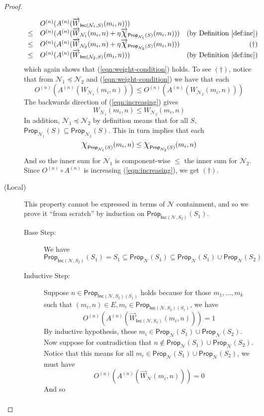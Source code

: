 \documentclass[letterpaper]{article}
\theoremstyle{definition}
\newcommand*{\bigchi}{\mbox{\Large$\chi$}}%
\newcommand{\Prop}{\textsf{Prop}}
\newcommand{\Inc}{\textsf{Inc}}
\newcommand{\Net}{\mathcal{N}}
\begin{document}
\begin{proof}
\begin{description}
\[\begin{array}{llr}
    &
    O^{(n)}(A^{(n)}(\overrightarrow{W}_{\Inc(\Net_1, S)}(m_i, n))) & 
    \\
    
    \leq &
    O^{(n)}(A^{(n)}(\overrightarrow{W}_{\Net_1}(m_i, n) + \eta \overrightarrow{\bigchi}_{\Prop_{\Net_1}(S)}(m_i, n))) & 
    \mbox{(by Definition~\ref{def:inc})}\\
    
    \leq &
    O^{(n)}(A^{(n)}(\overrightarrow{W}_{\Net_2}(m_i, n) + \eta \overrightarrow{\bigchi}_{\Prop_{\Net_2}(S)}(m_i, n))) & 
    (\dagger)\\
    
    \leq &
    O^{(n)}(A^{(n)}(\overrightarrow{W}_{\Inc(\Net_2, S)}(m_i, n))) & 
    \mbox{(by Definition~\ref{def:inc})}
    \end{array}
    \]
    which again shows that (\ref{eqn:weight-condition}) holds.  To see $(\dagger)$, notice that from $\Net_1 \preceq \Net_2$ and (\ref{eqn:weight-condition}) we have that each
    \[
    O^{(n)}(A^{(n)}(W_{\Net_1}(m_i, n))) \leq O^{(n)}(A^{(n)}(W_{\Net_2}(m_i, n)))
    \]
    The backwards direction of (\ref{eqn:increasing}) gives
    \[
    W_{\Net_1}(m_i, n) \leq W_{\Net_2}(m_i, n)
    \]
    In addition, $\Net_1 \preceq \Net_2$ by definition means that for all $S$, $\Prop_{\Net_1}(S) \subseteq \Prop_{\Net_2}(S)$.  This in turn implies that each
    \[
    \bigchi_{\Prop_{\Net_1}(S)}(m_i, n) \leq \bigchi_{\Prop_{\Net_2}(S)}(m_i, n)
    \]
    And so the inner sum for $\Net_1$ is component-wise $\leq$ the inner sum for $\Net_2$.  Since ${O^{(n)} \circ A^{(n)}}$ is increasing (\ref{eqn:increasing}), we get $(\dagger)$.
    
    \item[(Local)]
    This property cannot be expressed in terms of $\Net$ containment, and so we prove it ``from scratch'' by induction on $\Prop_{\Inc(\Net, S_2)}(S_1)$.
    
    \begin{description}
    \item[Base Step:] We have
    \[
    \Prop_{\Inc(\Net, S_2)}(S_1) = S_1 \subseteq \Prop_\Net(S_1) \subseteq \Prop_\Net(S_1) \cup \Prop_\Net(S_2)
    \]
    
    \item[Inductive Step:]
    Suppose $n \in \Prop_{\Inc(\Net, S_2)(S_1)}$ holds because for those $m_1, \ldots, m_k$ such that $(m_i, n) \in E, m_i \in \Prop_{\Inc(\Net, S_2)(S_1)}$, we have
    \[
    O^{(n)}(A^{(n)}(\overrightarrow{W}_{\Inc(\Net, S_2)}(m_i, n))) = 1
    \]
    By inductive hypothesis, these $m_i \in \Prop_\Net(S_1) \cup \Prop_\Net(S_2)$.  Now suppose for contradiction that $n \not \in \Prop_\Net(S_1) \cup \Prop_\Net(S_2)$.  Notice that this means for all $m_i \in \Prop_\Net(S_1) \cup \Prop_\Net(S_2)$, we must have
    \[
    O^{(n)}(A^{(n)}(\overrightarrow{W}_{\Net}(m_i, n))) = 0
    \]
    And so
    \[
    \begin{array}{lclr}
    

\end{array}\]
\end{description}
\end{description}
\end{proof}
\end{document}
